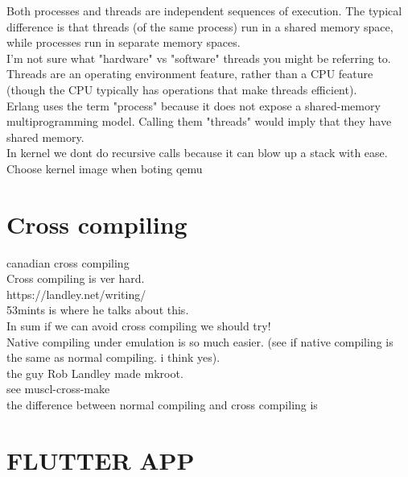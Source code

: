 \documentclass[11pt, a4paper, oneside]{article}
\theoremstyle{definition}
\begin{document}
Both processes and threads are independent sequences of execution. The typical difference is that threads (of the same process) run in a shared memory space, while processes run in separate memory spaces.\\

I'm not sure what "hardware" vs "software" threads you might be referring to. Threads are an operating environment feature, rather than a CPU feature (though the CPU typically has operations that make threads efficient).\\

Erlang uses the term "process" because it does not expose a shared-memory multiprogramming model. Calling them "threads" would imply that they have shared memory.\\


In kernel we dont do recursive calls because it can blow up a stack with ease.\\


Choose kernel image when boting qemu\\


\vfill
\pagebreak
\section{Cross compiling}
canadian cross compiling\\
Cross compiling is ver hard. \\
https://landley.net/writing/\\
53mints is where he talks about this.\\

In sum if we can avoid cross compiling we should try!\\

Native compiling under emulation is so much easier. (see if native compiling is the same as normal compiling. i think yes).\\

the guy Rob Landley made mkroot.\\

see muscl-cross-make\\

the difference between normal compiling and cross compiling is 


\vfill
\pagebreak
\section{FLUTTER APP}
\end{document}
